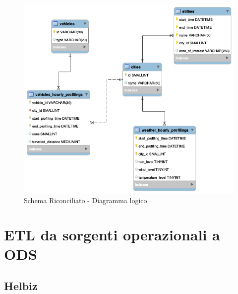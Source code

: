 \begin{figure}[H]                                                                                                                                                            
\centering                                                                                                                                                                   
\includegraphics[width=\textwidth]{diagrams/riconciliato_er}                                                                                                                                   
\caption{Schema Riconciliato - Diagramma logico}                                                                                                                                            
\label{fig:riconciliato_er}                                                                                                                                                           
\end{figure}

\section{ETL da sorgenti operazionali a ODS}

\subsection{Helbiz}

